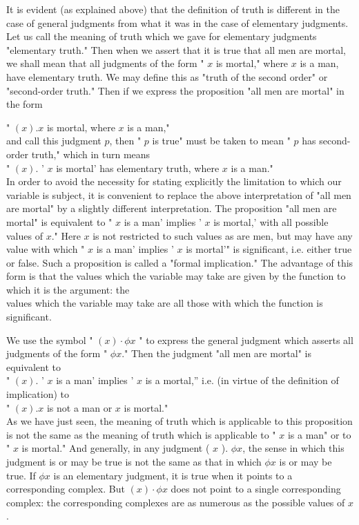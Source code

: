 \documentclass[10pt]{article}
\begin{document}
It is evident (as explained above) that the definition of truth is different in the case of general judgments from what it was in the case of elementary judgments. Let us call the meaning of truth which we gave for elementary judgments "elementary truth." Then when we assert that it is true that all men are mortal, we shall mean that all judgments of the form " $x$ is mortal," where $x$ is a man, have elementary truth. We may define this as "truth of the second order" or "second-order truth." Then if we express the proposition "all men are mortal" in the form

\begin{displayquote}
" $(x) . x$ is mortal, where $x$ is a man,"\\
and call this judgment $p$, then " $p$ is true" must be taken to mean " $p$ has second-order truth," which in turn means\\
" $(x)$. ' $x$ is mortal' has elementary truth, where $x$ is a man."\\
In order to avoid the necessity for stating explicitly the limitation to which our variable is subject, it is convenient to replace the above interpretation of "all men are mortal" by a slightly different interpretation. The proposition "all men are mortal" is equivalent to " $x$ is a man' implies ' $x$ is mortal,' with all possible values of $x$." Here $x$ is not restricted to such values as are men, but may have any value with which " $x$ is a man' implies ' $x$ is mortal'" is significant, i.e. either true or false. Such a proposition is called a "formal implication." The advantage of this form is that the values which the variable may take are given by the function to which it is the argument: the\\
values which the variable may take are all those with which the function is significant.
\end{displayquote}

We use the symbol " $(x) \cdot \phi x$ " to express the general judgment which asserts all judgments of the form " $\phi x$." Then the judgment "all men are mortal" is equivalent to\\
" $(x)$. ' $x$ is a man' implies ' $x$ is a mortal,'' i.e. (in virtue of the definition of implication) to\\
" $(x) . x$ is not a man or $x$ is mortal."\\
As we have just seen, the meaning of truth which is applicable to this proposition is not the same as the meaning of truth which is applicable to " $x$ is a man" or to " $x$ is mortal." And generally, in any judgment ( $x$ ). $\phi x$, the sense in which this judgment is or may be true is not the same as that in which $\phi x$ is or may be true. If $\phi x$ is an elementary judgment, it is true when it points to a corresponding complex. But $(x) \cdot \phi x$ does not point to a single corresponding complex: the corresponding complexes are as numerous as the possible values of $x$.
\end{document}
